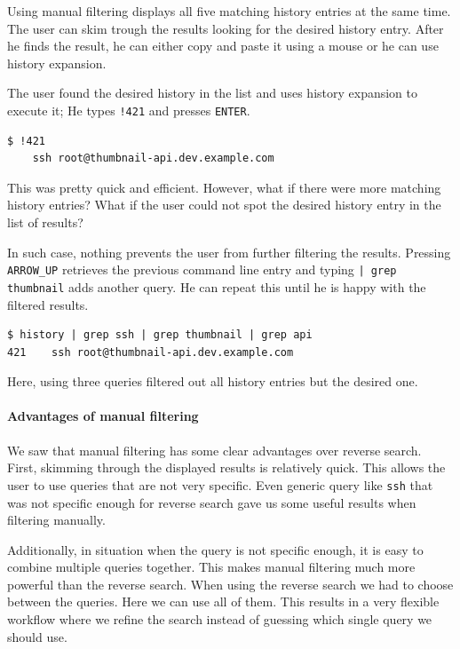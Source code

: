 Using manual filtering displays all five matching history entries at the same time. The user can skim trough the results looking for the desired history entry. 
After he finds the result, he can either copy and paste it using a mouse or he can use history expansion.

The user found the desired history in the list and uses history expansion to execute it; He types \verb|!421| and presses \verb|ENTER|.

\begin{verbatim}
$ !421
    ssh root@thumbnail-api.dev.example.com
\end{verbatim}

This was pretty quick and efficient. However, what if there were more matching history entries? What if the user could not spot the desired history entry in the list of results?

In such case, nothing prevents the user from further filtering the results. Pressing  \verb|ARROW_UP| retrieves the previous command line entry and typing \verb#| grep thumbnail# adds another query. He can repeat this until he is happy with the filtered results.

\begin{verbatim}
$ history | grep ssh | grep thumbnail | grep api
421    ssh root@thumbnail-api.dev.example.com
\end{verbatim}

Here, using three queries filtered out all history entries but the desired one.

\paragraph{Advantages of manual filtering}

We saw that manual filtering has some clear advantages over reverse search.
First, skimming through the displayed results is relatively quick. This allows the user to use queries that are not very specific.
Even generic query like \verb|ssh| that was not specific enough for reverse search gave us some useful results when filtering manually.

Additionally, in situation when the query is not specific enough, it is easy to combine multiple queries together. This makes manual filtering much more powerful than the reverse search. 
When using the reverse search we had to choose between the queries. Here we can use all of them. This results in a very flexible workflow where we refine the search instead of guessing which single query we should use.


